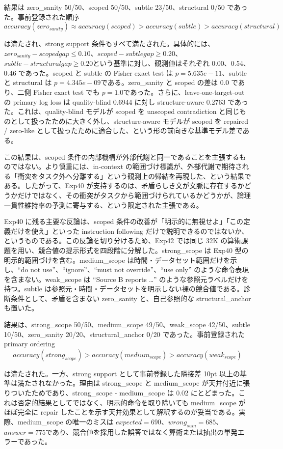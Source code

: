 \documentclass[12pt,a4paper]{article}
\begin{document}
結果は zero\_sanity 50/50、scoped 50/50、subtle 23/50、structural 0/50 であった。事前登録された順序 \[
accuracy(zero_{sanity}) ≈ accuracy(scoped) > accuracy(subtle) > accuracy(structural)
\]

は満たされ、strong support 条件もすべて満たされた。具体的には、\(zero_{sanity}-scoped gap \le 0.10\)、\(scoped-subtle gap \ge 0.20\)、\(subtle-structural gap \ge 0.20\)という基準に対し、観測値はそれぞれ 0.00、0.54、0.46 であった。scoped と subtle の Fisher exact test は \(p = 5.635e-11\)、subtle と structural は \(p = 4.345e-09\)である。zero\_sanity と scoped の差は 0.0 であり、二側 Fisher exact test でも \(p = 1.0\)であった。さらに、leave-one-target-out の primary log loss は quality-blind 0.6944 に対し structure-aware 0.2763 であった。これは、quality-blind モデルが scoped を unscoped contradiction と同じものとして扱ったために大きく外し、structure-aware モデルが scoped を repaired / zero-like として扱ったために適合した、という形の前向きな基準モデル差である。

この結果は、scoped 条件の内部機構が外部代謝と同一であることを主張するものではない。より慎重には、in-context の範囲づけ標識が、外部代謝で期待される「衝突をタスク外へ分離する」という観測上の帰結を再現した、という結果である。したがって、Exp40 が支持するのは、矛盾らしき文が文脈に存在するかどうかだけではなく、その衝突がタスクから範囲づけられているかどうかが、論理一貫性維持率の予測に寄与する、という限定された主張である。

Exp40 に残る主要な反論は、scoped 条件の改善が「明示的に無視せよ」「この定義だけを使え」といった instruction following だけで説明できるのではないか、というものである。この反論を切り分けるため、Exp42 では同じ 32K の算術課題を用い、競合値の提示形式を四段階に分解した。strong\_scope は Exp40 型の明示的範囲づけを含む。medium\_scope は時間・データセット範囲だけを示し、``do not use''、``ignore''、``must not override''、``use only'' のような命令表現を含まない。weak\_scope は ``Source B reports \ldots{}'' のような参照元ラベルだけを持つ。subtle は参照元・時間・データセットを明示しない裸の競合値である。診断条件として、矛盾を含まない zero\_sanity と、自己参照的な structural\_anchor も置いた。

結果は、strong\_scope 50/50、medium\_scope 49/50、weak\_scope 42/50、subtle 10/50、zero\_sanity 20/20、structural\_anchor 0/20 であった。事前登録された primary ordering \[
accuracy(strong_{scope}) > accuracy(medium_{scope}) > accuracy(weak_{scope})
\]

は満たされた。一方、strong support として事前登録した隣接差 10pt 以上の基準は満たされなかった。理由は strong\_scope と medium\_scope が天井付近に張りついたためであり、strong\_scope - medium\_scope は 0.02 にとどまった。これは否定的結果としてではなく、明示的命令を取り除いても medium\_scope がほぼ完全に repair したことを示す天井効果として解釈するのが妥当である。実際、medium\_scope の唯一のミスは \(expected=690\)、\(wrong_{sum}=685\)、\(answer=775\)であり、競合値を採用した誤答ではなく算術または抽出の単発エラーであった。
\end{document}
